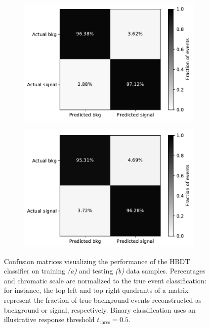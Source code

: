 \begin{figure}[t]
	\centering
	\begin{subfigure}{.45\textwidth}
		\includegraphics[width=\textwidth]{graphics/04-event_selection/confmatrix_train.pdf}
		\caption{}
	\end{subfigure}
	\begin{subfigure}{.45\textwidth}
		\includegraphics[width=\textwidth]{graphics/04-event_selection/confmatrix_test.pdf}
		\caption{}
	\end{subfigure}
	\caption{Confusion matrices visualizing the performance of the HBDT classifier on training \textit{(a)} and testing \textit{(b)} data samples. Percentages and chromatic scale are normalized to the true event classification: for instance, the top left and top right quadrants of a matrix represent the fraction of true background events reconstructed as background or signal, respectively. Binary classification uses an illustrative response threshold $t_\text{thres} = 0.5$.}
	\label{fig:4:confusion_matrix}
\end{figure}


